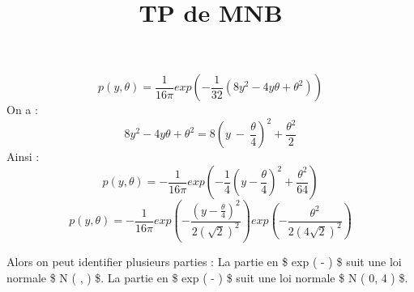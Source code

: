 \documentclass[]{article}
\title{TP de MNB}
\author{}
\date{}
\begin{document}
\maketitle

\[ p(y, \theta) = \frac{1}{16 \pi} exp \left( -\frac{1}{32} (8y^2 - 4 y \theta + \theta ^2) \right) \]
On a :
\[ 8y^2 - 4y\theta + \theta ^2 = 8\left( y \ - \ \frac{\theta}{4} \right)^2 + \frac{\theta ^2}{2} \]
Ainsi :
\[ p(y, \theta) = -\frac{1}{16 \pi} exp \left( -\frac{1}{4} \left( y - \frac{\theta}{4} \right) ^2 + \frac{\theta ^2}{64} \right) \]
\[ p(y, \theta) = -\frac{1}{16 \pi} exp \left( - \frac{ \left( y - \frac{\theta}{4} \right) ^2 }{2 (\sqrt 2) ^2} \right) exp \left( - \frac{ \theta ^2 }{2 (4\sqrt 2) ^2} \right)\]

Alors on peut identifier plusieurs parties : La partie en \$ exp \left(
- 
\right) \$ suit une loi normale \$ N \left( , 
\right) \$. La partie en \$ exp \left( -
 \right) \$ suit une loi normale \$ N
\left( 0, 4  \right) \$.
\end{document}
